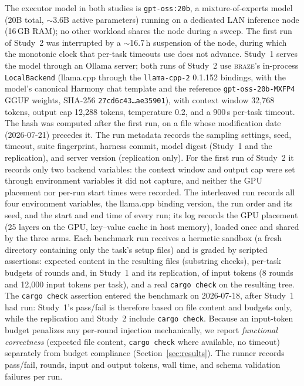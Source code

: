 \documentclass[smallcondensed,natbib]{svjour3}
\newcommand{\braze}{\textsc{braze}}
\begin{document}
The executor model in both studies is \texttt{gpt-oss:20b}, a
mixture-of-experts model (20B total, $\sim$3.6B active parameters)
running on a dedicated LAN inference node (16\,GB RAM); no other
workload shares the node during a sweep. The first run of Study~2 was
interrupted by a $\sim$16.7\,h suspension of the node, during which
the monotonic clock that per-task timeouts use does not advance. Study~1 serves the model
through an Ollama server; both runs of Study~2 use \braze{}'s in-process
\texttt{LocalBackend} (llama.cpp through the \texttt{llama-cpp-2}
0.1.152 bindings, with the model's canonical Harmony chat template and
the reference \texttt{gpt-oss-20b-MXFP4} GGUF weights, SHA-256
\texttt{27cd6c43\ldots ae35901}), with context window 32{,}768 tokens,
output cap 12{,}288 tokens, temperature 0.2, and a 900\,s per-task
timeout. The hash was computed after the first run, on a file whose
modification date (2026-07-21) precedes it. The run metadata records
the sampling settings, seed, timeout, suite fingerprint, harness
commit, model digest (Study~1 and the replication), and server version
(replication only). For the first run of Study~2 it records only two
backend variables: the context window and output cap were set through
environment variables it did not capture, and neither the GPU
placement nor per-run start times were recorded. The interleaved run
records all four environment variables, the llama.cpp binding version,
the run order and its seed, and the start and end time of every run;
its log records the GPU placement (25 layers on the GPU, key--value
cache in host memory), loaded once and shared by the three arms. Each benchmark run receives a hermetic sandbox (a
fresh directory containing only the task's setup files) and is graded
by scripted assertions: expected content in the resulting files
(substring checks), per-task budgets of rounds and, in Study~1 and its
replication, of input tokens (8 rounds and 12{,}000 input tokens per
task), and a real \texttt{cargo check} on the resulting tree. The
\texttt{cargo check} assertion entered the benchmark on 2026-07-18,
after Study~1 had run: Study~1's pass/fail is therefore based on file
content and budgets only, while the replication and Study~2 include
\texttt{cargo check}. Because an input-token budget penalizes any
per-round injection mechanically, we report \emph{functional
correctness} (expected file content, \texttt{cargo check} where
available, no timeout) separately from budget compliance
(Section~\ref{sec:results}). The runner records
pass/fail, rounds, input and output tokens, wall time, and schema
validation failures per run.
\end{document}
